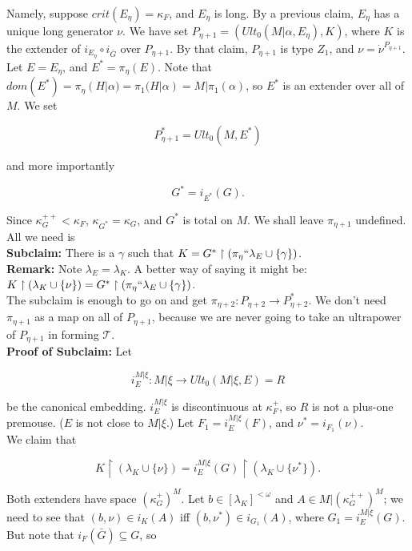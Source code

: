 \documentclass[12pt]{article}
\begin{document}
Namely, suppose $crit(E_\eta) = \kappa_F$, and $E_\eta$ is long.  By a previous claim, $E_\eta$ has a unique long generator $\nu$.  We have set $P_{\eta + 1} = (Ult_0 (M | \alpha , E_\eta) , K)$, where $K$ is the extender of $i_{E_\eta} \circ i_{\bar{G}}$ over $P_{\eta + 1}$.  By that claim, $P_{\eta + 1}$ is type $Z_1$, and $\nu = \dot{\nu}^{P_{\eta+1}}$.  Let $E = E_\eta$, and $E^* = \pi_\eta (E)$.  Note that $dom (E^*) = \pi_\eta (H | \alpha) = \pi_1 (H | \alpha ) = M | \pi_1 (\alpha)$, so $E^*$ is an extender over all of $M$.  We set

\[
P_{\eta + 1}^* = Ult_0 (M, E^*)
\]

and more importantly

\[
G^* = i_{E^*} (G).
\]

Since $\kappa_{G}^{++} < \kappa_F$, $\kappa_{G^*} = \kappa_G$, and $G^*$ is total on $M$.  We shall leave $\pi_{\eta + 1}$ undefined.  All we need is\\

\textbf{Subclaim:} There is a $\gamma$ such that $K = G^* \restriction ( \pi_\eta `` \lambda_E \cup \{ \gamma \} )$.\\

\textbf{Remark:} Note $\lambda_E = \lambda_K$.  A better way of saying it might be: $K \restriction ( \lambda_K \cup \{ \nu \} ) = G^* \restriction ( \pi_\eta `` \lambda_E \cup \{ \gamma \} )$.\\

The subclaim is enough to go on and get $\pi_{\eta + 2}: P_{\eta + 2} \longrightarrow P_{\eta + 2}^*$.  We don't need $\pi_{\eta + 1}$ as a map on all of $P_{\eta + 1}$, because we are never going to take an ultrapower of $P_{\eta + 1}$ in forming $\mathscr{T}$.\\

\textbf{Proof of Subclaim:} Let

\[
i_E^{M | \xi} : M | \xi \longrightarrow Ult_0 (M | \xi , E ) = R
\]

be the canonical embedding. $i_E^{M | \xi}$ is discontinuous at $\kappa_F^+$, so $R$ is not a plus-one premouse.  ($E$ is not close to $M | \xi$.) Let $F_1 = i_E^{M | \xi} (F)$, and $\nu^* = i_{F_1} (\nu )$.\\

We claim that

\[
K \restriction (\lambda_K \cup \{ \nu \} ) = i_E^{M | \xi} (G) \restriction (\lambda_K \cup \{ \nu^* \} ).
\]

Both extenders have space $(\kappa_G^+)^M$.  Let $b \in [ \lambda_K ]^{< \omega}$ and $A \in M | (\kappa_G^{++})^M$; we need to see that $( b , \nu ) \in i_K (A)$ iff $(b, \nu^* ) \in i_{G_1} (A)$, where $G_1 = i_E^{M| \xi} (G)$.  But note that $i_F (\bar{G}) \subseteq G$, so
\end{document}

